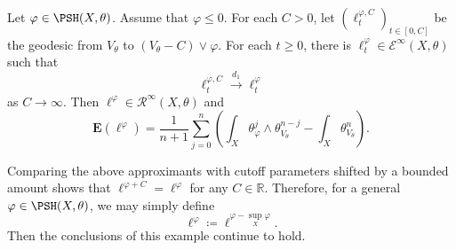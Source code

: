 \begin{example}\label{ex:rayasspsh}
    Let $\varphi\in \PSH(X,\theta)$. Assume that $\varphi\leq 0$.
    For each $C>0$, let $(\ell^{\varphi,C}_t)_{t\in [0,C]}$ be the geodesic from $V_{\theta}$ to $(V_{\theta}-C)\lor \varphi$. For each $t\geq 0$, there is $\ell^{\varphi}_t\in \mathcal{E}^{\infty}(X,\theta)$ such that
    \begin{equation}\label{eq:ellvarphiraydef}
        \ell^{\varphi,C}_t\xrightarrow{d_1}\ell^{\varphi}_t
    \end{equation}
    as $C\to \infty$.
    Then $\ell^{\varphi}\in \mathcal{R}^{\infty}(X,\theta)$ and
\begin{equation}\label{eq:Elphi}
\mathbf{E}(\ell^{\varphi})=\frac{1}{n+1} \sum_{j=0}^n \left(\int_X \theta_{\varphi}^j\wedge \theta_{V_{\theta}}^{n-j}-\int_X \theta_{V_{\theta}}^n\right).
\end{equation}
\end{example}
Comparing the above approximants with cutoff parameters shifted by a bounded amount shows that $\ell^{\varphi+C}=\ell^{\varphi}$ for any $C\in \mathbb{R}$. Therefore, for a general $\varphi\in \PSH(X,\theta)$, we may simply define
\[
\ell^{\varphi}\coloneqq \ell^{\varphi-\sup_X\varphi}.
\]
Then the conclusions of this example continue to hold.
